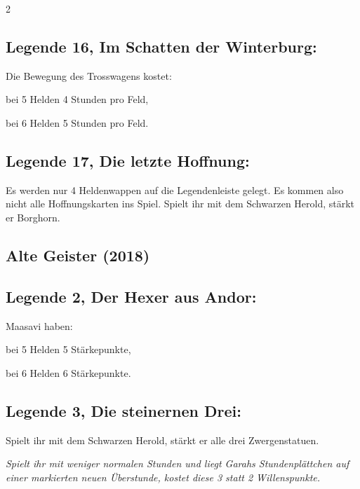 \documentclass[10pt, a4paper, oneside]{book}
\newcommand{\fan}[1]{\textit{#1}}
\begin{document}
\begin{multicols*}{2}
\begin{bgcolor}
\subsection{Legende 16, Im Schatten der Winterburg:}

Die Bewegung des Trosswagens kostet:
\supercite{DH16:a2_5-6,MH:DlH_5-6}

\bullet{} bei 5 Helden 4 Stunden pro Feld,

\bullet{} bei 6 Helden 5 Stunden pro Feld.




\subsection{Legende 17, Die letzte Hoffnung:}

Es werden nur 4 Heldenwappen auf die Legendenleiste gelegt. Es kommen also nicht alle Hoffnungskarten ins Spiel.
\supercite{DH17:a0_5-6,MH:DlH_5-6}
Spielt ihr mit dem Schwarzen Herold, stärkt er Borghorn.
\supercite{DH17:a0_5-6}

\end{bgcolor}



\begin{bgcolor}[color-AG]
\section{Alte Geister (2018)}


\subsection{Legende 2, Der Hexer aus Andor:}

Maasavi haben:
\supercite{AG:Begleitheft}

\bullet{} bei 5 Helden 5 Stärkepunkte,

\bullet{} bei 6 Helden 6 Stärkepunkte.


\subsection{Legende 3, Die steinernen Drei:}

Spielt ihr mit dem Schwarzen Herold, stärkt er alle drei Zwergenstatuen.
\supercite{AG:Begleitheft}

\fan{Spielt ihr mit weniger normalen Stunden und liegt Garahs Stundenplättchen auf einer markierten neuen Überstunde, kostet diese 3 statt 2 Willenspunkte.}


\end{bgcolor}
\end{multicols*}
\end{document}
